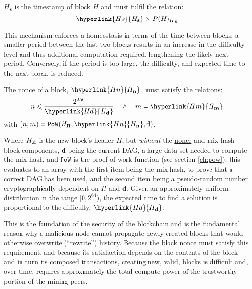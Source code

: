 \documentclass[9pt,oneside]{amsart}
\newcommand{\hcancel}[1]{%
    \tikz[baseline=(tocancel.base)]{
        \node[inner sep=0pt,outer sep=0pt] (tocancel) {#1};
        \draw[black] (tocancel.south west) -- (tocancel.north east);
    }%
}%
\begin{document}
\begin{multicols}{2}
\hyperlink{H s}{$H_\mathbf{s}$} is the timestamp of block $H$ and must fulfil the relation:
\begin{equation}
\hyperlink{H s}{H_\mathbf{s}} > {P(H)_H}_\mathbf{s}
\end{equation}

This mechanism enforces a homeostasis in terms of the time between blocks; a smaller period between the last two blocks results in an increase in the difficulty level and thus additional computation required, lengthening the likely next period. Conversely, if the period is too large, the difficulty, and expected time to the next block, is reduced.

The nonce of a block, $\hyperlink{H n}{H_\mathbf{n}}$, must satisfy the relations:
\begin{equation}
n \leqslant \frac{2^{256}}{\hyperlink{H d}{H_\mathbf{d}}} \quad \wedge \quad m = \hyperlink{H m}{H_\mathbf{m}}
\end{equation}
with $(n, m) = \mathtt{PoW}(H_{\hcancel{n}}, \hyperlink{H n}{H_\mathbf{n}}, \mathbf{d})$.

\hypertarget{h cancel n}{}
Where $H_{\hcancel{n}}$ is the new block's header $H$, but \textit{without} the \hyperlink{block nonce}{nonce} and mix-hash block components, $\mathbf{d}$ being the current DAG, a large data set needed to compute the mix-hash, and $\mathtt{PoW}$ is the proof-of-work function (see section \ref{ch:pow}): this evaluates to an array with the first item being the mix-hash, to prove that a correct DAG has been used, and the second item being a pseudo-random number cryptographically dependent on $H$ and $\mathbf{d}$. Given an approximately uniform distribution in the range $[0, 2^{64})$, the expected time to find a solution is proportional to the difficulty, $\hyperlink{H d}{H_\mathbf{d}}$.

This is the foundation of the security of the blockchain and is the fundamental reason why a malicious node cannot propagate newly created blocks that would otherwise overwrite (``rewrite'') history. Because the \hyperlink{block nonce}{block nonce} must satisfy this requirement, and because its satisfaction depends on the contents of the block and in turn its composed transactions, creating new, valid, blocks is difficult and, over time, requires approximately the total compute power of the trustworthy portion of the mining peers.


\end{multicols}
\end{document}

